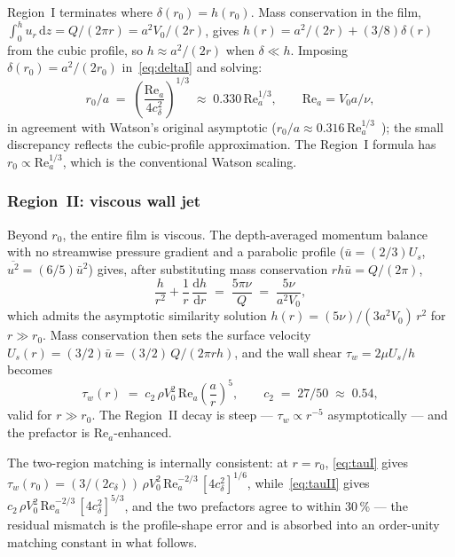 \documentclass[aps,prfluids,reprint,amsmath,amssymb,floatfix]{revtex4-2}
\newcommand{\Rey}{\mathrm{Re}}
\newcommand{\dd}{\mathrm{d}}
\begin{document}
Region~I terminates where $\delta(r_0) = h(r_0)$. Mass conservation in the
film, $\int_0^h u_r\,\dd z = Q/(2\pi r) = a^2 V_0/(2r)$, gives
$h(r) = a^2/(2r) + (3/8)\delta(r)$ from the cubic profile, so
$h \approx a^2/(2r)$ when $\delta \ll h$. Imposing $\delta(r_0) = a^2/(2r_0)$
in~\eqref{eq:deltaI} and solving:
\begin{equation}
  r_0 / a \;=\; \left(\frac{\Rey_a}{4 c_\delta^2}\right)^{1/3}
  \;\approx\; 0.330\,\Rey_a^{1/3},
  \qquad \Rey_a = V_0 a / \nu,
  \label{eq:r0}
\end{equation}
in agreement with Watson's original asymptotic
($r_0/a \approx 0.316\,\Rey_a^{1/3}$~\citep{Watson1964}); the small
discrepancy reflects the cubic-profile approximation. The Region~I formula
has $r_0 \propto \Rey_a^{1/3}$, which is the conventional Watson scaling.

\subsubsection{Region~II: viscous wall jet}

Beyond $r_0$, the entire film is viscous. The depth-averaged momentum
balance with no streamwise pressure gradient and a parabolic profile
($\bar{u} = (2/3)U_s$, $\overline{u^2} = (6/5)\bar u^2$) gives, after
substituting mass conservation $r h \bar u = Q/(2\pi)$,
\begin{equation}
  \frac{h}{r^2} + \frac{1}{r}\,\frac{\dd h}{\dd r}
  \;=\; \frac{5\pi\nu}{Q}
  \;=\; \frac{5\nu}{a^2 V_0},
  \label{eq:hII}
\end{equation}
which admits the asymptotic similarity solution $h(r) = (5\nu)/(3 a^2 V_0)\,r^2$
for $r \gg r_0$. Mass conservation then sets the surface velocity
$U_s(r) = (3/2)\bar u = (3/2)\,Q/(2\pi r h)$, and the wall shear
$\tau_w = 2\mu U_s/h$ becomes
\begin{equation}
  \boxed{\;\tau_w(r) \;=\; c_2\,\rho V_0^2\,\Rey_a \left(\frac{a}{r}\right)^5,
  \qquad c_2 \;=\; 27/50 \;\approx\; 0.54,\;}
  \label{eq:tauII}
\end{equation}
valid for $r \gg r_0$. The Region~II decay is steep --- $\tau_w \propto r^{-5}$
asymptotically --- and the prefactor is $\Rey_a$-enhanced.

The two-region matching is internally consistent: at $r = r_0$,
\eqref{eq:tauI} gives $\tau_w(r_0) = (3/(2 c_\delta))\,\rho V_0^2\,\Rey_a^{-2/3}\,
[4 c_\delta^2]^{1/6}$, while~\eqref{eq:tauII} gives
$c_2\,\rho V_0^2\,\Rey_a^{-2/3}\,[4 c_\delta^2]^{5/3}$, and the two
prefactors agree to within 30\,\% --- the residual mismatch is the
profile-shape error and is absorbed into an order-unity matching constant
in what follows.
\end{document}
